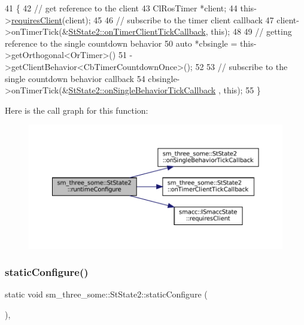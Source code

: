 \begin{DoxyCode}
41     \{
42         \textcolor{comment}{// get reference to the client}
43         ClRosTimer *client;
44         this->\hyperlink{classsmacc_1_1ISmaccState_a7f95c9f0a6ea2d6f18d1aec0519de4ac}{requiresClient}(client);
45 
46         \textcolor{comment}{// subscribe to the timer client callback}
47         client->onTimerTick(&\hyperlink{structsm__three__some_1_1StState2_a489156949b0f8f08fc7e32850154ded8}{StState2::onTimerClientTickCallback}, \textcolor{keyword}{this});
48 
49         \textcolor{comment}{// getting reference to the single countdown behavior}
50         \textcolor{keyword}{auto} *cbsingle = this->getOrthogonal<OrTimer>()
51                              ->getClientBehavior<CbTimerCountdownOnce>();
52 
53         \textcolor{comment}{// subscribe to the single countdown behavior callback}
54         cbsingle->onTimerTick(&\hyperlink{structsm__three__some_1_1StState2_ac24b22f90d939c7207ca75e82344a5ef}{StState2::onSingleBehaviorTickCallback}
      , \textcolor{keyword}{this});
55     \}
\end{DoxyCode}
Here is the call graph for this function\+:
\nopagebreak
\begin{figure}[H]
\begin{center}
\leavevmode
\includegraphics[width=350pt]{structsm__three__some_1_1StState2_aab0c27caa0d5a70c644ee1ec0830ba15_cgraph}
\end{center}
\end{figure}
\mbox{\label{structsm__three__some_1_1StState2_af07ae40962e343ce9605288f0ebad82b}} 
\subsubsection{\texorpdfstring{static\+Configure()}{staticConfigure()}}
{\footnotesize\ttfamily static void sm\+\_\+three\+\_\+some\+::\+St\+State2\+::static\+Configure (\begin{DoxyParamCaption}{ }\end{DoxyParamCaption})\hspace{0.3cm}{\ttfamily [inline]}, {\ttfamily [static]}}



